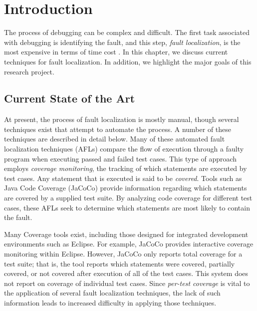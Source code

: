 %
%

\chapter{Introduction}\label{ch:intro} %

The process of debugging can be complex and difficult.  The first task
associated with debugging is identifying the fault, and this step,
\emph{fault localization}, is the most expensive in terms of time cost
\cite{harrold}. In this chapter, we discuss current techniques for
fault localization.  In addition, we highlight the major goals of this
research project.

\section{Current State of the Art}\label{sec:state}
At present, the process of fault localization is mostly
manual, though several techniques exist that attempt to automate the
process.  A number of these techniques are described in detail below.
Many of these automated fault localization techniques (AFLs) compare the
flow of execution through a faulty program when executing passed and
failed test cases.  This type of approach employs \emph{coverage
monitoring}, the tracking of which statements are executed by test
cases.  Any statement that is executed is said to be \emph{covered}.
Tools such as Java Code Coverage (JaCoCo) \cite{jacoco} provide
information regarding which statements are covered by a supplied test
suite.  By analyzing code coverage for different test cases, these AFLs
seek to determine which statements are most likely to contain the fault.

Many Coverage tools exist, including those designed for integrated development
environments such as Eclipse.  For example, JaCoCo provides interactive
coverage monitoring within Eclipse.  However, JaCoCo only reports total
coverage for a test suite; that is, the tool reports which statements
were covered, partially covered, or not covered after execution of all
of the test cases.  This system does not report on coverage of
individual test cases.  Since \emph{per-test coverage} is vital to the
application of several fault localization techniques, the lack of such
information leads to increased difficulty in applying those techniques.

